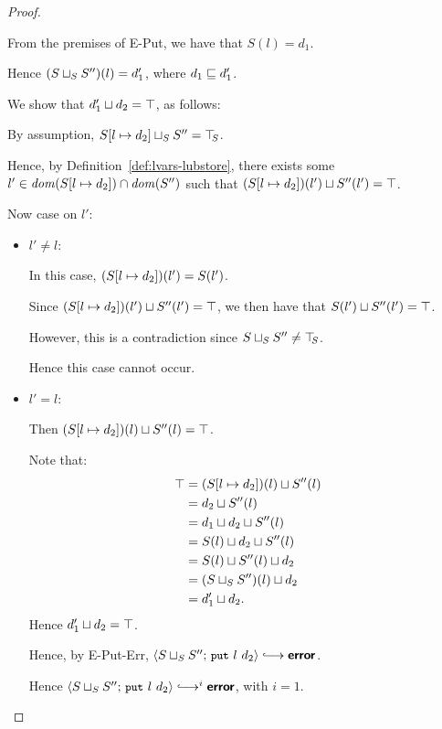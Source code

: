 \begin{proof}
\begin{itemize}
\begin{itemize}
      From the premises of {\sc E-Put}, we have that $S(l) = d_1$.

      Hence $(S \sqcup_{S} S'')(l) = d'_1$, where $d_1 \sqsubseteq
      d'_1$.

      We show that $d'_1 \sqcup d_2 = \top$, as follows:

      By assumption, $S[l \mapsto d_2] \sqcup_{S} S'' = \top\hspace{-0.85mm}_{S}$.

      Hence, by Definition~\ref{def:lvars-lubstore}, there exists
      some $l' \in \mathit{dom}(S[l \mapsto d_2]) \cap \mathit{dom}(S'')$ such
      that $(S[l \mapsto d_2])(l') \sqcup S''(l') = \top$.

      Now case on $l'$:

      \begin{itemize}
      \item $l' \neq l$:

        In this case, $(S[l \mapsto d_2])(l') = S(l')$.

        Since $(S[l \mapsto d_2])(l') \sqcup S''(l') = \top$,
        we then have that $S(l') \sqcup S''(l') = \top$.

        However, this is a contradiction since $S \sqcup_{S} S'' \neq
        \top\hspace{-0.85mm}_{S}$.

        Hence this case cannot occur.

      \item $l' = l$:

        Then $(S[l \mapsto d_2])(l) \sqcup S''(l) = \top$.

        Note that:
        \begin{align*}
          \top &= (S[l \mapsto d_2])(l) \sqcup S''(l) \\ &=
          d_2 \sqcup S''(l) \\ &=
          d_1 \sqcup d_2 \sqcup S''(l) \\ &=
          S(l) \sqcup d_2 \sqcup S''(l) \\ &=
          S(l) \sqcup S''(l) \sqcup d_2 \\ &=
          (S \sqcup_{S} S'')(l) \sqcup d_2 \\ &=
          d'_1 \sqcup d_2.
        \end{align*}
        Hence $d'_1 \sqcup d_2 = \top$.

        Hence, by {\sc E-Put-Err},
        $\config{\lubstore{S}{S''}}{\putexp{l}{d_2}} \parstepsto
        \error$.

        Hence $\config{\lubstore{S}{S''}}{\putexp{l}{d_2}}
        \parstepsto^i \error$, with $i = 1$.


\end{itemize}
\end{itemize}
\end{itemize}
\end{proof}
